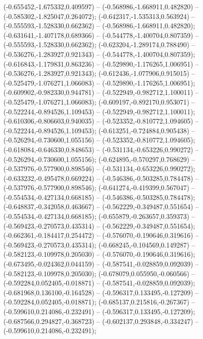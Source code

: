 (-0.655452,-1.675332,0.409597) -- (-0.568986,-1.668911,0.482820) -- (-0.585302,-1.825047,0.264072);
 (-0.642317,-1.535313,0.563924) -- (-0.555593,-1.528330,0.662362) -- (-0.568986,-1.668911,0.482820);
 (-0.631641,-1.407178,0.689366) -- (-0.544778,-1.400704,0.807359) -- (-0.555593,-1.528330,0.662362);
 (-0.623204,-1.289174,0.788490) -- (-0.536276,-1.283927,0.921343) -- (-0.544778,-1.400704,0.807359);
 (-0.616843,-1.179831,0.863236) -- (-0.529890,-1.176265,1.006951) -- (-0.536276,-1.283927,0.921343);
 (-0.612436,-1.077906,0.915015) -- (-0.525479,-1.076271,1.066083) -- (-0.529890,-1.176265,1.006951);
 (-0.609902,-0.982330,0.944781) -- (-0.522949,-0.982712,1.100011) -- (-0.525479,-1.076271,1.066083);
 (-0.609197,-0.892170,0.953071) -- (-0.522244,-0.894526,1.109453) -- (-0.522949,-0.982712,1.100011);
 (-0.610306,-0.806603,0.940035) -- (-0.523352,-0.810772,1.094605) -- (-0.522244,-0.894526,1.109453);
 (-0.613251,-0.724884,0.905438) -- (-0.526294,-0.730600,1.055156) -- (-0.523352,-0.810772,1.094605);
 (-0.618084,-0.646330,0.848653) -- (-0.531134,-0.653226,0.990272) -- (-0.526294,-0.730600,1.055156);
 (-0.624895,-0.570297,0.768629) -- (-0.537976,-0.577900,0.898546) -- (-0.531134,-0.653226,0.990272);
 (-0.633232,-0.495478,0.669224) -- (-0.546386,-0.503285,0.784478) -- (-0.537976,-0.577900,0.898546);
 (-0.641274,-0.419399,0.567047) -- (-0.554534,-0.427134,0.668185) -- (-0.546386,-0.503285,0.784478);
 (-0.648837,-0.342058,0.463667) -- (-0.562229,-0.349487,0.551654) -- (-0.554534,-0.427134,0.668185);
 (-0.655879,-0.263657,0.359373) -- (-0.569423,-0.270573,0.435314) -- (-0.562229,-0.349487,0.551654);
 (-0.662361,-0.184417,0.254472) -- (-0.576070,-0.190646,0.319616) -- (-0.569423,-0.270573,0.435314);
 (-0.668245,-0.104569,0.149287) -- (-0.582123,-0.109978,0.205030) -- (-0.576070,-0.190646,0.319616);
 (-0.673495,-0.024362,0.044159) -- (-0.587541,-0.028859,0.092039) -- (-0.582123,-0.109978,0.205030);
 (-0.678079,0.055950,-0.060566) -- (-0.592284,0.052405,-0.018871) -- (-0.587541,-0.028859,0.092039);
 (-0.681968,0.136100,-0.164528) -- (-0.596317,0.133495,-0.127209) -- (-0.592284,0.052405,-0.018871);
 (-0.685137,0.215816,-0.267367) -- (-0.599610,0.214086,-0.232491) -- (-0.596317,0.133495,-0.127209);
 (-0.687566,0.294827,-0.368723) -- (-0.602137,0.293848,-0.334247) -- (-0.599610,0.214086,-0.232491);
